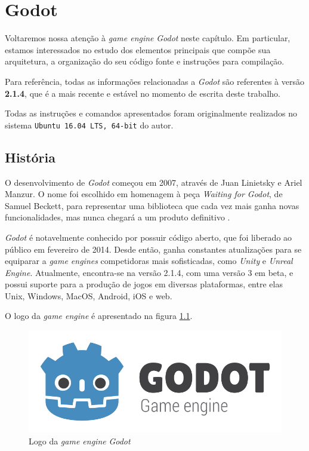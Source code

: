 \chapter{Godot}
\label{cap:godot}

Voltaremos nossa atenção à \textit{game engine} \textit{Godot} neste capítulo. Em particular, estamos interessados no estudo dos elementos principais que compõe sua arquitetura, a organização do seu código fonte e instruções para compilação.

Para referência, todas as informações relacionadas a \textit{Godot} são referentes à versão \textbf{2.1.4}, que é a mais recente e estável no momento de escrita deste trabalho.

Todas as instruções e comandos apresentados foram originalmente realizados no sistema \texttt{Ubuntu 16.04 LTS, 64-bit} do autor.


\section{História}

O desenvolvimento de \textit{Godot} começou em 2007, através de Juan Linietsky e Ariel Manzur. O nome foi escolhido em homenagem à peça \emph{Waiting for Godot}, de Samuel Beckett, para representar uma biblioteca que cada vez mais ganha novas funcionalidades, mas nunca chegará a um produto definitivo \citep{godotHistory}.

\textit{Godot} é notavelmente conhecido por possuir código aberto, que foi liberado ao público em fevereiro de 2014. Desde então, ganha constantes atualizações para se equiparar a \textit{game engines} competidoras mais sofisticadas, como \textit{Unity} e \textit{Unreal Engine}. Atualmente, encontra-se na versão 2.1.4, com uma versão 3 em beta, e possui suporte para a produção de jogos em diversas plataformas, entre elas Unix, Windows, MacOS, Android, iOS e web.

O logo da \textit{game engine} é apresentado na figura \ref{godotLogo}.

\begin{figure}[H]
  \centering
  \includegraphics[width=.5\textwidth]{image/godot-logo.png}
  \caption{Logo da \textit{game engine} \textit{Godot} \citep{godotHistory}}
  \label{godotLogo}
\end{figure}

